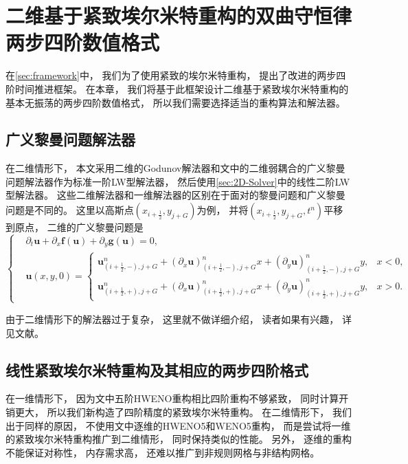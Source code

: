 \chapter{二维基于紧致埃尔米特重构的双曲守恒律两步四阶数值格式}
\label{sec:2D-method}

在\cref{sec:framework}中，
我们为了使用紧致的埃尔米特重构，
提出了改进的两步四阶时间推进框架。
在本章，
我们将基于此框架设计二维基于紧致埃尔米特重构的基本无振荡的两步四阶数值格式，
所以我们需要选择适当的重构算法和解法器。

\section{广义黎曼问题解法器}
\label{sec:2D-solver-sec4}

在二维情形下，
本文采用二维的Godunov解法器和文\cite{GRP_qi}中的二维弱耦合的广义黎曼问题解法器作为标准一阶LW型解法器，
然后使用\cref{sec:2D-Solver}中的线性二阶LW型解法器。
这些二维解法器和一维解法器的区别在于面对的黎曼问题和广义黎曼问题是不同的。
这里以高斯点$(x_{i+\frac{1}{2}},y_{j+G})$为例，
并将$(x_{i+\frac{1}{2}},y_{j+G},t^n)$平移到原点，
二维的广义黎曼问题是
\begin{equation}
  \label{eq:2D-GRP}
  \left\{
  \begin{aligned}
     & {\partial_{t}}{\bm{u}} + {\partial_{x}}{\bm{f}}({\bm{u}}) + {\partial_{y}}{\bm{g}}({\bm{u}}) = 0, \\
     & {\bm{u}}(x,y,0) =
    \begin{cases}
      {\bm{u}}_{(i+\frac{1}{2},-),j+G}^n + \left({\partial_{x}}{\bm{u}}\right)_{(i+\frac{1}{2},-),j+G}^n x + \left({\partial_{y}}{\bm{u}}\right)_{(i+\frac{1}{2},-),j+G}^n y, & x<0,  \\
      {\bm{u}}_{(i+\frac{1}{2},+),j+G}^n + \left({\partial_{x}}{\bm{u}}\right)_{(i+\frac{1}{2},+),j+G}^n x + \left({\partial_{y}}{\bm{u}}\right)_{(i+\frac{1}{2},+),j+G}^n y, & x>0.
    \end{cases}
  \end{aligned}
  \right.
\end{equation}

由于二维情形下的解法器过于复杂，
这里就不做详细介绍，
读者如果有兴趣，
详见文献\cite{GRP_qi}。

\section{线性紧致埃尔米特重构及其相应的两步四阶格式}
\label{sec:2D-linear-rec}

在一维情形下，
因为文\cite{du2018hermite}中五阶HWENO重构相比四阶重构不够紧致，
同时计算开销更大，
所以我们新构造了四阶精度的紧致埃尔米特重构。
在二维情形下，
我们出于同样的原因，
不使用文\cite{du2018hermite}中逐维的HWENO5和WENO5重构，
而是尝试将一维的紧致埃尔米特重构推广到二维情形，
同时保持类似的性能。
另外，
逐维的重构不能保证对称性，
内存需求高，
还难以推广到非规则网格与非结构网格。

